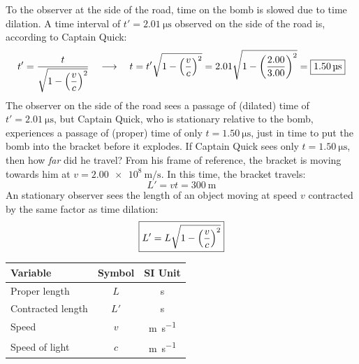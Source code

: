 To the observer at the side of the road, time on the bomb is slowed due to
time dilation. A time interval of $t'=\SI{2.01}{\micro\second}$ observed on
the side of the road is, according to Captain Quick:
\begin{displaymath}
  t' = \frac t{\sqrt{1-\left(\dfrac vc\right)^2}}\quad\longrightarrow\quad
  t = t'\sqrt{1-\left(\dfrac vc\right)^2}
  = 2.01\sqrt{1-\left(\frac{2.00}{3.00}\right)^2}
  = \boxed{\SI{1.50}{\micro\second}}
\end{displaymath}
The observer on the side of the road sees a passage of (dilated) time of
$t'=\SI{2.01}{\micro\second}$, but Captain Quick, who is stationary relative
to the bomb, experiences a passage of (proper) time of only
$t=\SI{1.50}{\micro\second}$, just in time to put the bomb into the bracket
before it explodes.
%
%
%
%
If Captain Quick sees only $t=\SI{1.50}{\micro\second}$, then how \emph{far}
did he travel? From his frame of reference, the bracket is moving towards him
at $v=\SI{2.00e8}{\metre\per\second}$. In this time, the bracket travels:
\begin{displaymath}
  L'=vt=\boxed{\SI{300}\metre}
\end{displaymath}
%  
%
%
%
%
%
An stationary observer sees the length of an object moving at speed $v$
contracted by the same factor as time dilation:  
\begin{equation}
  \boxed{L'=L\sqrt{1-\left(\dfrac vc\right)^2}}
\end{equation}
\begin{center}
  \begin{tabular}{l|c|c}
    \rowcolor{pink}
    \textbf{Variable} & \textbf{Symbol} & \textbf{SI Unit}\\ \hline
    Proper length     & $L$  & \si\second \\
    Contracted length & $L'$ & \si\second \\
    Speed             & $v$ & \si{\metre\per\second}\\
    Speed of light    & $c$ & \si{\metre\per\second}
  \end{tabular}
\end{center}

